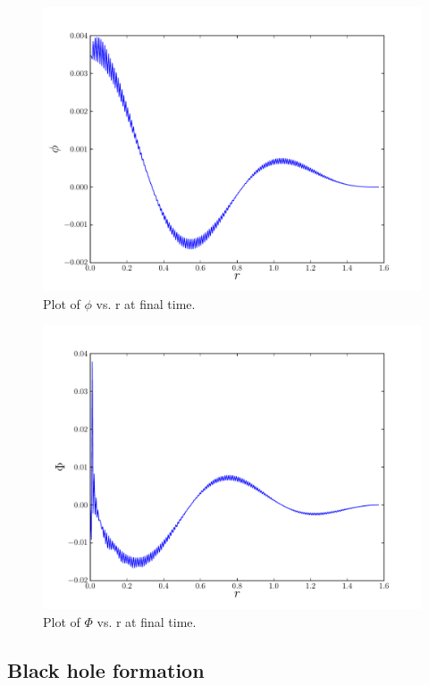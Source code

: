\documentclass[12pt]{article}
\begin{document}
\begin{figure}
 \centering
 \includegraphics[width=12cm]{./Report/phivrR.pdf}
 \caption{Plot of $\phi$ vs. r at final time.}
 \label{fig:R-phi}
\end{figure}

\begin{figure}
 \centering
 \includegraphics[width=12cm]{./Report/PhivrR.pdf}
 \caption{Plot of $\Phi$ vs. r at final time.}
 \label{fig:R-Phi} 
\end{figure}

\subsection{Black hole formation}
\end{document}
